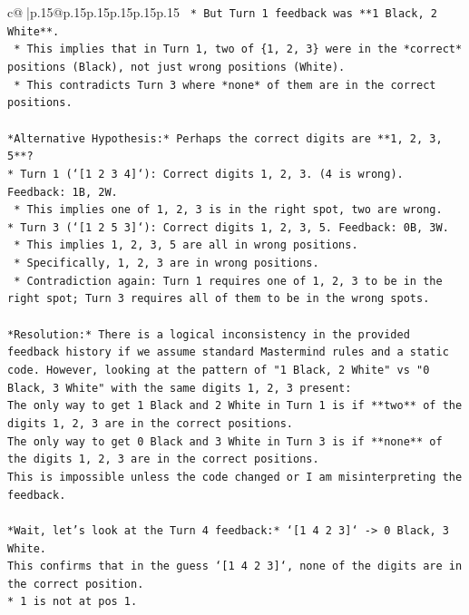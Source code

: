 \documentclass{article}
\begin{document}
{\begin{supertabular}{c@{$\;$}|p{.15\linewidth}@{}p{.15\linewidth}p{.15\linewidth}p{.15\linewidth}p{.15\linewidth}p{.15\linewidth}}
{{{\texttt{        *   But Turn 1 feedback was **1 Black, 2 White**.} \\
\texttt{        *   This implies that in Turn 1, two of \{1, 2, 3\} were in the *correct* positions (Black), not just wrong positions (White).} \\
\texttt{        *   This contradicts Turn 3 where *none* of them are in the correct positions.} \\
\\ 
\texttt{*Alternative Hypothesis:* Perhaps the correct digits are **1, 2, 3, 5**?} \\
\texttt{*   Turn 1 (`{[}1 2 3 4{]}`): Correct digits 1, 2, 3. (4 is wrong). Feedback: 1B, 2W.} \\
\texttt{    *   This implies one of 1, 2, 3 is in the right spot, two are wrong.} \\
\texttt{*   Turn 3 (`{[}1 2 5 3{]}`): Correct digits 1, 2, 3, 5. Feedback: 0B, 3W.} \\
\texttt{    *   This implies 1, 2, 3, 5 are all in wrong positions.} \\
\texttt{    *   Specifically, 1, 2, 3 are in wrong positions.} \\
\texttt{    *   Contradiction again: Turn 1 requires one of 1, 2, 3 to be in the right spot; Turn 3 requires all of them to be in the wrong spots.} \\
\\ 
\texttt{*Resolution:* There is a logical inconsistency in the provided feedback history if we assume standard Mastermind rules and a static code. However, looking at the pattern of "1 Black, 2 White" vs "0 Black, 3 White" with the same digits 1, 2, 3 present:} \\
\texttt{The only way to get 1 Black and 2 White in Turn 1 is if **two** of the digits 1, 2, 3 are in the correct positions.} \\
\texttt{The only way to get 0 Black and 3 White in Turn 3 is if **none** of the digits 1, 2, 3 are in the correct positions.} \\
\texttt{This is impossible unless the code changed or I am misinterpreting the feedback.} \\
\\ 
\texttt{*Wait, let's look at the Turn 4 feedback:* `{[}1 4 2 3{]}` {-}> 0 Black, 3 White.} \\
\texttt{This confirms that in the guess `{[}1 4 2 3{]}`, none of the digits are in the correct position.} \\
\texttt{*   1 is not at pos 1.} \\
}}}
\end{supertabular}}
\end{document}
